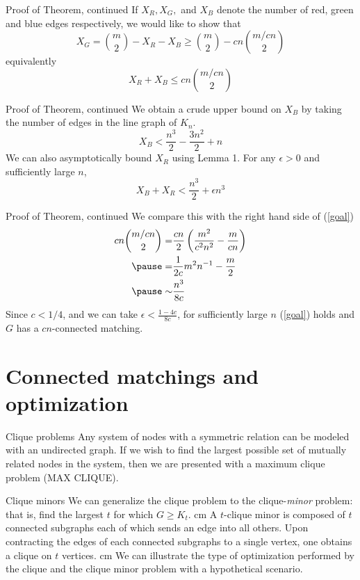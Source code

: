 \documentclass{beamer}
\newcommand{\bframe}[2]{\begin{frame}{#1}#2\end{frame}}
\begin{document}
\bframe{Proof of Theorem, continued}{
 If $X_R, X_G,$ and $X_B$ denote the number of red, green and blue edges respectively, we would like to show that \[X_G = {m\choose 2} - X_R - X_B \geq {m\choose 2} - cn{m/cn\choose 2}\] \pause 
equivalently \pause
\begin{equation}
	X_R + X_B \leq cn{m/cn\choose 2}\label{goal}
\end{equation}
}

\bframe{Proof of Theorem, continued}{
We obtain a crude upper bound on $X_B$ by taking the number of edges in the line graph of $K_n$. \pause
\begin{equation}
	X_B < \frac{n^3}{2} - \frac{3n^2}{2} + n
\end{equation}\pause
We can also asymptotically bound $X_R$ using Lemma 1.  \pause For any $\epsilon > 0$ and sufficiently large $n$,\pause  \[X_B + X_R < \frac{n^3}{2} + \epsilon n^3\]
}

\bframe{Proof of Theorem, continued}{
We compare this with the right hand side of (\ref{goal})\pause
\begin{eqnarray}
	cn{m/cn\choose 2} =&\displaystyle \frac{cn}{2}\left(\frac{m^2}{c^2n^2} - \frac{m}{cn}\right)\\ \pause
	=& \displaystyle \frac{1}{2c}m^2n^{-1} - \frac{m}{2}\\ \pause
	\sim&   \displaystyle \frac{n^3}{8c}
\end{eqnarray}
Since $c < 1/4$, and we can take $\epsilon < \frac{1-4c}{8c}$, for sufficiently large $n$ (\ref{goal}) holds and $G$ has a $cn$-connected matching.
}


\section{Connected matchings and optimization}

\bframe{Clique problems}{
	Any system of nodes with a symmetric relation can be modeled with an undirected graph.\pause\vskip 0.5cm
	If we wish to find the largest possible set of mutually related nodes in the system, then we are presented with a maximum clique problem (MAX CLIQUE).\pause{}cm
	}

\bframe{Clique minors}{
	We can generalize the clique problem to the clique-\textit{minor} problem:  \pause that is, find the largest $t$ for which $G \geq K_t$.\pause\vskip 0.5 cm
	 A $t$-clique minor is composed of $t$ connected subgraphs each of which sends an edge into all others.  \pause  Upon contracting the edges of each connected subgraphs to a single vertex, one obtains a clique on $t$ vertices. \pause\vskip 0.5 cm
	We can illustrate the type of optimization performed by the clique and the clique minor problem with a hypothetical scenario.}
\end{document}
